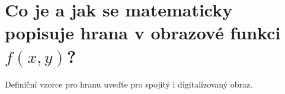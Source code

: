 \section{Co je a jak se matematicky popisuje hrana v obrazové funkci \texorpdfstring{$f(x,y)$}{f(x,y)}?}
Definiční vzorce pro hranu uveďte pro spojitý i digitalizovaný obraz.